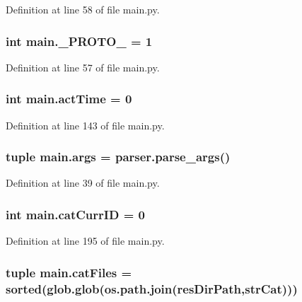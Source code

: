 Definition at line 58 of file main.\-py.

\hypertarget{a00151_afe92b072adc360963093d3660e7684ce}{
\subsubsection[{\-\_\-\-P\-R\-O\-T\-O\-\_\-}]{\setlength{\rightskip}{0pt plus 5cm}int main.\-\_\-\-P\-R\-O\-T\-O\-\_\- = 1}}\label{a00151_afe92b072adc360963093d3660e7684ce}


Definition at line 57 of file main.\-py.

\hypertarget{a00151_a9c2013c88f8354ccf6504c51843f1d5e}{
\subsubsection[{act\-Time}]{\setlength{\rightskip}{0pt plus 5cm}int main.\-act\-Time = 0}}\label{a00151_a9c2013c88f8354ccf6504c51843f1d5e}


Definition at line 143 of file main.\-py.

\hypertarget{a00151_a80760a53c8941c6f6f30e633649ffd8d}{
\subsubsection[{args}]{\setlength{\rightskip}{0pt plus 5cm}tuple main.\-args = parser.\-parse\-\_\-args()}}\label{a00151_a80760a53c8941c6f6f30e633649ffd8d}


Definition at line 39 of file main.\-py.

\hypertarget{a00151_aa56c55225fa65fa569bd8d5f1063550e}{
\subsubsection[{cat\-Curr\-I\-D}]{\setlength{\rightskip}{0pt plus 5cm}int main.\-cat\-Curr\-I\-D = 0}}\label{a00151_aa56c55225fa65fa569bd8d5f1063550e}


Definition at line 195 of file main.\-py.

\hypertarget{a00151_a189dc9cf606d870dacab059d5e7dca24}{
\subsubsection[{cat\-Files}]{\setlength{\rightskip}{0pt plus 5cm}tuple main.\-cat\-Files = sorted(glob.\-glob(os.\-path.\-join({\bf res\-Dir\-Path},{\bf str\-Cat})))}}\label{a00151_a189dc9cf606d870dacab059d5e7dca24}


